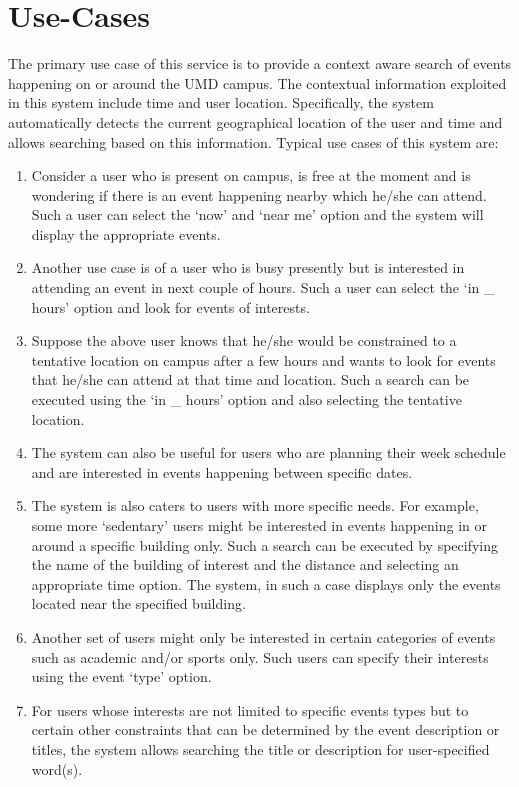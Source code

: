 \documentclass{acm_proc_article-sp}
\begin{document}
\section{Use-Cases}
The primary use case of this service is to provide a context aware search of events happening on or around the UMD campus. The contextual information exploited in this system include time and user location. Specifically, the system automatically detects the current geographical location of the user and time and allows searching based on this information. Typical use cases of this system are:
\begin{enumerate}
\item{Consider a user who is present on campus, is free at the moment and is wondering if there is an event happening nearby which he/she can attend. Such a user can select the `now' and `near me' option and the system will display the appropriate events.}
\item{Another use case is of a user who is busy presently but is interested in attending an event in next couple of hours. Such a user can select the `in \_ hours' option and look for events of interests.}
\item{Suppose the above user knows that he/she would be constrained to a tentative location on campus after a few hours and wants to look for events that he/she can attend at that time and location. Such a search can be executed using the `in \_ hours' option and also selecting the tentative location.}
\item{The system can also be useful for users who are planning their week schedule and are interested in events happening between specific dates. }
\item{The system is also caters to users with more specific needs. For example, some more `sedentary' users might be interested in events happening in or around a specific building only. Such a search can be executed by specifying the name of the building of interest and the distance and selecting an appropriate time option. The system, in such a case displays only the events located near the specified building.}
\item{Another set of users might only be interested in certain categories of events such as academic and/or sports only. Such users can specify their interests using the event `type' option.}
\item{For users whose interests are not limited to specific events types but to certain other constraints that can be determined by the event description or titles, the system allows searching the title or description for user-specified word(s).}
\end{enumerate}
\end{document}
